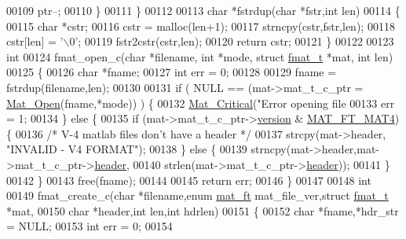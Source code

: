 \begin{DoxyCode}
00109         ptr--;
00110     \}
00111 \}
00112 
00113 \textcolor{keywordtype}{char} *fstrdup(\textcolor{keywordtype}{char} *fstr,\textcolor{keywordtype}{int} len)
00114 \{
00115     \textcolor{keywordtype}{char} *cstr;
00116     cstr = malloc(len+1);
00117     strncpy(cstr,fstr,len);
00118     cstr[len] = \textcolor{charliteral}{'\(\backslash\)0'};
00119     fstr2cstr(cstr,len);
00120     \textcolor{keywordflow}{return} cstr;
00121 \}
00122 
00123 \textcolor{keywordtype}{int}
00124 fmat\_open\_c(\textcolor{keywordtype}{char} *filename, \textcolor{keywordtype}{int} *mode, \textcolor{keyword}{struct} \hyperlink{structfmat__t}{fmat\_t} *mat, \textcolor{keywordtype}{int} len)
00125 \{
00126     \textcolor{keywordtype}{char} *fname;
00127     \textcolor{keywordtype}{int} err = 0;
00128 
00129     fname = fstrdup(filename,len);
00130 
00131     \textcolor{keywordflow}{if} ( NULL == (mat->mat\_t\_c\_ptr = \hyperlink{group___m_a_t_gafbfedb5636a99f0ef867520c47f77d18}{Mat\_Open}(fname,*mode)) ) \{
00132         \hyperlink{group__mat__util_gaf51f2bfbb5580f575e4dd79757e2b80c}{Mat\_Critical}(\textcolor{stringliteral}{"Error opening file %
00133         err = 1;
00134     \} \textcolor{keywordflow}{else} \{
00135         \textcolor{keywordflow}{if} (mat->mat\_t\_c\_ptr->\hyperlink{struct__mat__t_a729c2bc0afc97485057a5af425635b1a}{version} & \hyperlink{group___m_a_t_ggad03442b8378999189d510e3745c702b7a858b4f5da65548219b1c3ad47aa478d3}{MAT\_FT\_MAT4}) \{
00136             \textcolor{comment}{/* V-4 matlab files don't have a header */}
00137             strcpy(mat->header, \textcolor{stringliteral}{"INVALID - V4 FORMAT"});
00138         \} \textcolor{keywordflow}{else} \{
00139             strncpy(mat->header,mat->mat\_t\_c\_ptr->\hyperlink{struct__mat__t_a5ed5d0e4e3c4d76b626a8a1772d579c4}{header},
00140                     strlen(mat->mat\_t\_c\_ptr->\hyperlink{struct__mat__t_a5ed5d0e4e3c4d76b626a8a1772d579c4}{header}));
00141         \}
00142     \}
00143     free(fname);
00144 
00145     \textcolor{keywordflow}{return} err;
00146 \}
00147 
00148 \textcolor{keywordtype}{int}
00149 fmat\_create\_c(\textcolor{keywordtype}{char} *filename,\textcolor{keyword}{enum} \hyperlink{group___m_a_t_gad03442b8378999189d510e3745c702b7}{mat\_ft} mat\_file\_ver,\textcolor{keyword}{struct} \hyperlink{structfmat__t}{fmat\_t} *mat,
00150     \textcolor{keywordtype}{char} *header,\textcolor{keywordtype}{int} len,\textcolor{keywordtype}{int} hdrlen)
00151 \{
00152     \textcolor{keywordtype}{char} *fname,*hdr\_str = NULL;
00153     \textcolor{keywordtype}{int} err = 0;
00154 
}
\end{DoxyCode}
